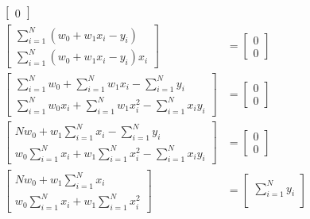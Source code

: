 \documentclass[12pt]{article}
\begin{document}
\begin{itemize}
\begin{itemize}
\begin{align*}
\begin{bmatrix}
                                0
                            \end{bmatrix}\\
                            \begin{bmatrix}
                                \sum_{i=1}^N (w_0 + w_1x_i - y_i)\\
                                \sum_{i=1}^N (w_0 + w_1x_i - y_i)x_i
                            \end{bmatrix} &= \begin{bmatrix}
                                0\\
                                0
                            \end{bmatrix}\\
                            \begin{bmatrix}
                                \sum_{i=1}^N w_0 + \sum_{i=1}^N w_1x_i - \sum_{i=1}^N y_i\\
                                \sum_{i=1}^N w_0x_i + \sum_{i=1}^N w_1x_i^2 - \sum_{i=1}^N {x_i}y_i
                            \end{bmatrix} &= \begin{bmatrix}
                                0\\
                                0
                            \end{bmatrix}\\
                            \begin{bmatrix}
                                Nw_0 + w_1\sum_{i=1}^N x_i - \sum_{i=1}^N y_i\\
                                w_0\sum_{i=1}^N x_i + w_1\sum_{i=1}^N x_i^2 - \sum_{i=1}^N {x_i}y_i
                            \end{bmatrix} &= \begin{bmatrix}
                                0\\
                                0
                            \end{bmatrix}\\
                            \begin{bmatrix}
                                Nw_0 + w_1\sum_{i=1}^N x_i\\
                                w_0\sum_{i=1}^N x_i + w_1\sum_{i=1}^N x_i^2
                            \end{bmatrix} &= \begin{bmatrix}
                                \sum_{i=1}^N y_i\\

\end{bmatrix}
\end{align*}
\end{itemize}
\end{itemize}
\end{document}
